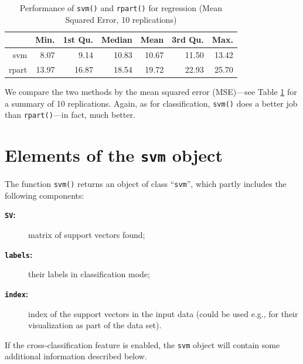 \documentclass[a4paper]{article}
\begin{document}
\begin{table}[ht]
\begin{center}
\begin{tabular}{rrrrrrr}
\hline
 & Min. & 1st Qu. & Median & Mean & 3rd Qu. & Max. \\
\hline
svm & 8.07 & 9.14 & 10.83 & 10.67 & 11.50 & 13.42 \\
rpart & 13.97 & 16.87 & 18.54 & 19.72 & 22.93 & 25.70 \\
\hline
\end{tabular}
\caption{Performance of \texttt{svm()} and
       \texttt{rpart()} for regression (Mean Squared Error, 10 replications)}
\label{tab:reg}
\end{center}
\end{table}
\noindent We compare the two methods by the mean squared error (MSE)---see Table
\ref{tab:reg} for a summary of 10 replications. 
Again, as for classification, \texttt{svm()}
does a better job than \texttt{rpart()}---in fact, much better.

\section*{Elements of the \texttt{svm} object}

The function \texttt{svm()} returns an object of class ``\texttt{svm}'',
which partly includes the following components:

\begin{description}
 \item[\textbf{\texttt{SV}:}] matrix of support vectors found;
 \item[\textbf{\texttt{labels}:}] their labels in classification mode;
 \item[\textbf{\texttt{index}:}] index of the support vectors in the input data (could
  be used e.g., for their visualization as part of the data set).
\end{description}
If the cross-classification feature is enabled, the
\texttt{svm} object will contain some additional information described below.
\end{document}
